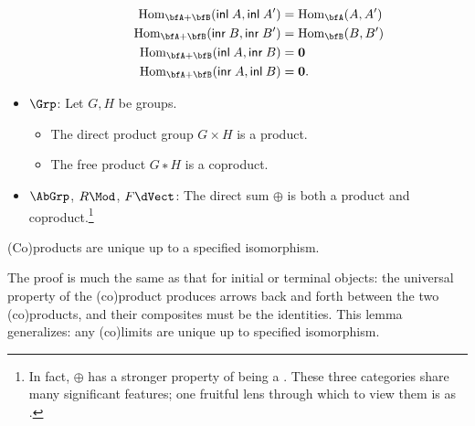 \documentclass[./thesis.tex]{subfiles}
\begin{document}
\begin{example}
\begin{itemize}
\begin{itemize}
          \begin{align*}
            \Hom_{\bfA+\bfB}(\apply{\inl}{A}, \apply{\inl}{A'}) &= \Hom_{\bfA}(A,A') \\
            \Hom_{\bfA+\bfB}(\apply{\inr}{B}, \apply{\inr}{B'}) &= \Hom_{\bfB}(B,B') \\
            \Hom_{\bfA+\bfB}(\apply{\inl}{A}, \apply{\inr}{B}) &= \emptytype \\
            \Hom_{\bfA+\bfB}(\apply{\inr}{A}, \apply{\inl}{B}) &= \emptytype.
          \end{align*}
      \end{itemize}
    \item $\Grp$: Let $G,H$ be groups.
      \begin{itemize}\renewcommand{\labelitemi}{$∘$}
        \itemsep-0.2em
        \item \vspace{-0.6em} The direct product group $G×H$ is a product.
        \item The free product $G∗H$ is a coproduct.
      \end{itemize}
    \item $\AbGrp$, $R\Mod$, $F\dVect$: The direct sum $⊕$ is both a product and
      coproduct.\footnote{In fact, $⊕$ has a stronger property of being a
      . These three categories share many significant
      features; one fruitful lens through which to view them is as
      .} 
  \end{itemize}
\end{example}

\begin{lemma}
	(Co)products are unique up to a specified isomorphism.
\end{lemma}

The proof is much the same as that for initial or terminal objects: the
universal property of the (co)product produces arrows back and forth between the
two (co)products, and their composites must be the identities. This lemma
generalizes: any (co)limits are unique up to specified isomorphism.
\end{document}
